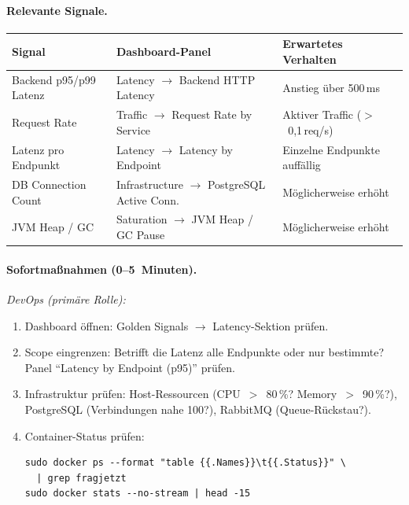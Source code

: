\paragraph{Relevante Signale.}

\begin{table}[H]
\centering
\small
\begin{tabularx}{\textwidth}{l l >{\RaggedRight\arraybackslash}X}
\toprule
\textbf{Signal} & \textbf{Dashboard-Panel} & \textbf{Erwartetes Verhalten} \\
\midrule
Backend p95/p99 Latenz & Latency $\rightarrow$ Backend HTTP Latency & Anstieg über 500\,ms \\
Request Rate & Traffic $\rightarrow$ Request Rate by Service & Aktiver Traffic ($>$~0{,}1\,req/s) \\
Latenz pro Endpunkt & Latency $\rightarrow$ Latency by Endpoint & Einzelne Endpunkte auffällig \\
DB Connection Count & Infrastructure $\rightarrow$ PostgreSQL Active Conn. & Möglicherweise erhöht \\
JVM Heap / GC & Saturation $\rightarrow$ JVM Heap / GC Pause & Möglicherweise erhöht \\
\bottomrule
\end{tabularx}
\end{table}

\paragraph{Sofortmaßnahmen (0--5~Minuten).}

\emph{DevOps (primäre Rolle):}
\begin{enumerate}
  \item Dashboard öffnen: Golden Signals $\rightarrow$ Latency-Sektion prüfen.
  \item Scope eingrenzen: Betrifft die Latenz alle Endpunkte oder nur bestimmte? Panel \enquote{Latency by Endpoint (p95)} prüfen.
  \item Infrastruktur prüfen: Host-Ressourcen (CPU~$>$~80\,\%? Memory~$>$~90\,\%?), PostgreSQL (Verbindungen nahe 100?), RabbitMQ (Queue-Rückstau?).\\
  \item Container-Status prüfen:
\begin{lstlisting}[style=bashstyle]
sudo docker ps --format "table {{.Names}}\t{{.Status}}" \
  | grep fragjetzt
sudo docker stats --no-stream | head -15
\end{lstlisting}
\end{enumerate}

